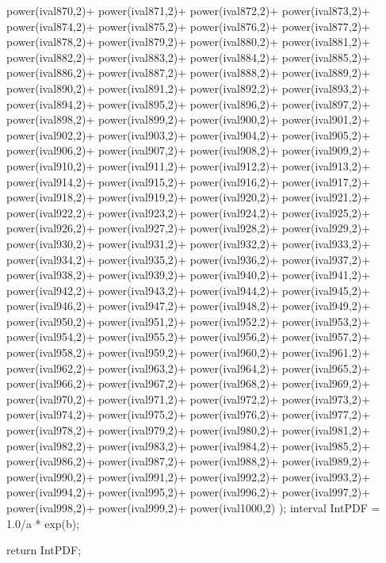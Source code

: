 \begin{DoxyCode}
{power(ival870,2)+
power(ival871,2)+
power(ival872,2)+
power(ival873,2)+
power(ival874,2)+
power(ival875,2)+
power(ival876,2)+
power(ival877,2)+
power(ival878,2)+
power(ival879,2)+
power(ival880,2)+
power(ival881,2)+
power(ival882,2)+
power(ival883,2)+
power(ival884,2)+
power(ival885,2)+
power(ival886,2)+
power(ival887,2)+
power(ival888,2)+
power(ival889,2)+
power(ival890,2)+
power(ival891,2)+
power(ival892,2)+
power(ival893,2)+
power(ival894,2)+
power(ival895,2)+
power(ival896,2)+
power(ival897,2)+
power(ival898,2)+
power(ival899,2)+
power(ival900,2)+
power(ival901,2)+
power(ival902,2)+
power(ival903,2)+
power(ival904,2)+
power(ival905,2)+
power(ival906,2)+
power(ival907,2)+
power(ival908,2)+
power(ival909,2)+
power(ival910,2)+
power(ival911,2)+
power(ival912,2)+
power(ival913,2)+
power(ival914,2)+
power(ival915,2)+
power(ival916,2)+
power(ival917,2)+
power(ival918,2)+
power(ival919,2)+
power(ival920,2)+
power(ival921,2)+
power(ival922,2)+
power(ival923,2)+
power(ival924,2)+
power(ival925,2)+
power(ival926,2)+
power(ival927,2)+
power(ival928,2)+
power(ival929,2)+
power(ival930,2)+
power(ival931,2)+
power(ival932,2)+
power(ival933,2)+
power(ival934,2)+
power(ival935,2)+
power(ival936,2)+
power(ival937,2)+
power(ival938,2)+
power(ival939,2)+
power(ival940,2)+
power(ival941,2)+
power(ival942,2)+
power(ival943,2)+
power(ival944,2)+
power(ival945,2)+
power(ival946,2)+
power(ival947,2)+
power(ival948,2)+
power(ival949,2)+
power(ival950,2)+
power(ival951,2)+
power(ival952,2)+
power(ival953,2)+
power(ival954,2)+
power(ival955,2)+
power(ival956,2)+
power(ival957,2)+
power(ival958,2)+
power(ival959,2)+
power(ival960,2)+
power(ival961,2)+
power(ival962,2)+
power(ival963,2)+
power(ival964,2)+
power(ival965,2)+
power(ival966,2)+
power(ival967,2)+
power(ival968,2)+
power(ival969,2)+
power(ival970,2)+
power(ival971,2)+
power(ival972,2)+
power(ival973,2)+
power(ival974,2)+
power(ival975,2)+
power(ival976,2)+
power(ival977,2)+
power(ival978,2)+
power(ival979,2)+
power(ival980,2)+
power(ival981,2)+
power(ival982,2)+
power(ival983,2)+
power(ival984,2)+
power(ival985,2)+
power(ival986,2)+
power(ival987,2)+
power(ival988,2)+
power(ival989,2)+
power(ival990,2)+
power(ival991,2)+
power(ival992,2)+
power(ival993,2)+
power(ival994,2)+
power(ival995,2)+
power(ival996,2)+
power(ival997,2)+
power(ival998,2)+
power(ival999,2)+
power(ival1000,2)
);
   interval IntPDF = 1.0/a * exp(b);

  return IntPDF;
}
\end{DoxyCode}
